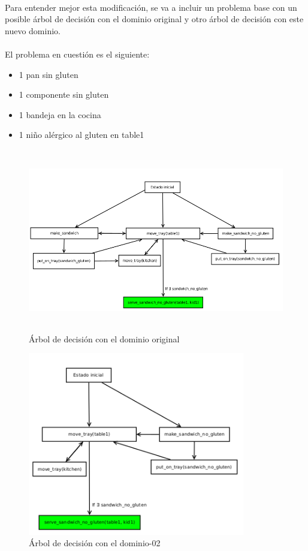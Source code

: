 \documentclass{article}
\begin{document}
\paragraph{}
Para entender mejor esta modificación, se va a incluir un problema base con un posible árbol de decisión con el dominio original y otro árbol de decisión con este nuevo dominio.

\paragraph{}
El problema en cuestión es el siguiente:
\begin{itemize}
    \item 1 pan sin gluten
    \item 1 componente sin gluten
    \item 1 bandeja en la cocina
    \item 1 niño alérgico al gluten en table1
\end{itemize}

\begin{figure}[H]
    \centering
    \includegraphics[width=\textwidth, height=8cm]{domain-02-1}
    \caption{Árbol de decisión con el dominio original}
\end{figure}

\begin{figure}[H]
    \centering
    \includegraphics[width=\textwidth, height=8cm]{domain-02-2}
    \caption{Árbol de decisión con el dominio-02}
\end{figure}
\end{document}
